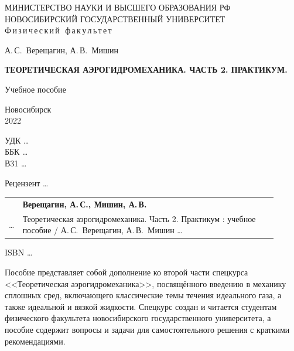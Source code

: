 \documentclass[14pt]{extarticle}
\begin{document}
\begin{titlepage}
	\pagestyle{empty}




	\centering	
	\footnotesize
	МИНИСТЕРСТВО НАУКИ И ВЫСШЕГО ОБРАЗОВАНИЯ РФ\\
	НОВОСИБИРСКИЙ ГОСУДАРСТВЕННЫЙ УНИВЕРСИТЕТ\\
	Ф\,и\,з\,и\,ч\,е\,с\,к\,и\,й\, \,ф\,а\,к\,у\,л\,ь\,т\,е\,т	
	
	
	\small
	\bigskip
	\bigskip
	\bigskip
	\bigskip
	
	А.\,С.~Верещагин, А.\,В.~Мишин
	\bigskip
	
	\textbf{ТЕОРЕТИЧЕСКАЯ АЭРОГИДРОМЕХАНИКА. ЧАСТЬ 2. ПРАКТИКУМ.}
	\bigskip
	
	Учебное пособие	
	
	\vfill	
	Новосибирск\\
	2022\\


\end{titlepage}


\footnotesize

\noindent УДК \ldots \\%
\noindent ББК \ldots \\%
\noindent В31 \ldots \\%


\begin{center}
	\centering
	Рецензент \ldots\\
\end{center}


\noindent
\begin{tabular}{p{0.01\linewidth}p{0.90\linewidth}}
	& 	\textbf{Верещагин, А.\,С., Мишин, А.\,В.}\\
	\ldots %
	& 
	Теоретическая аэрогидромеханика. Часть 2. Практикум : учебное пособие / А.\,С. Верещагин, А.\,В.~Мишин \ldots %
\end{tabular}

\medskip
ISBN  \ldots%

\medskip
Пособие представляет собой дополнение ко второй части спецкурса <<Теоретическая аэрогидромеханика>>, посвящённого введению в механику сплошных сред, включающего классические темы течения идеального газа, а также идеальной и вязкой жидкости. Спецкурс создан и читается   студентам физического факультета новосибирского государственного университета, а пособие содержит вопросы и задачи для самостоятельного решения с краткими рекомендациями.  
\end{document}
